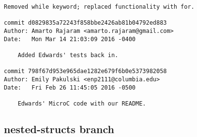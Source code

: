 \begin{lstlisting}[backgroundcolor=\color{white}]
    Removed while keyword; replaced functionality with for.

commit d0829835a72243f858bbe2426ab81b04792ed883
Author: Amarto Rajaram <amarto.rajaram@gmail.com>
Date:   Mon Mar 14 21:03:09 2016 -0400

    Added Edwards' tests back in.

commit 798f67d953e965dae1282e679f6b0e5373982058
Author: Emily Pakulski <enp2111@columbia.edu>
Date:   Fri Feb 26 11:45:05 2016 -0500

    Edwards' MicroC code with our README.

    \end{lstlisting}

\subsection{nested-structs branch}
